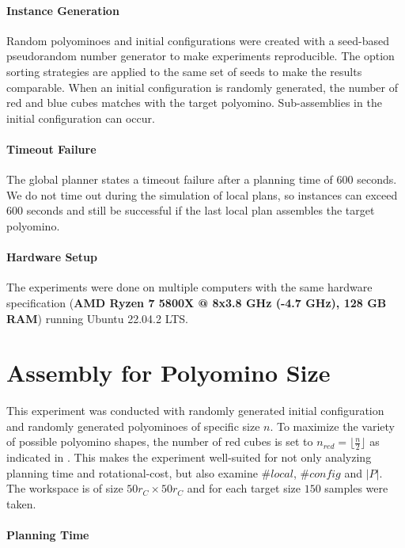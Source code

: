 \paragraph{Instance Generation}
Random polyominoes and initial configurations were created with a seed-based pseudorandom number generator to make experiments reproducible.
The option sorting strategies are applied to the same set of seeds to make the results comparable.
When an initial configuration is randomly generated, the number of red and blue cubes matches with the target polyomino.
Sub-assemblies in the initial configuration can occur.

\paragraph{Timeout Failure}
The global planner states a timeout failure after a planning time of $600$ seconds.
We do not time out during the simulation of local plans, so instances can exceed $600$ seconds and still be successful if the last local plan assembles the target polyomino.

\paragraph{Hardware Setup}
The experiments were done on multiple computers with the same hardware specification (\textbf{AMD Ryzen 7 5800X @ 8x3.8 GHz (-4.7 GHz), 128 GB RAM}) running Ubuntu 22.04.2 LTS.



\section{Assembly for Polyomino Size}
\label{sec:AFN}

This experiment was conducted with randomly generated initial configuration and randomly generated polyominoes of specific size $n$.
To maximize the variety of possible polyomino shapes, the number of red cubes is set to $n_\textit{red} = \lfloor \frac{n}{2} \rfloor$ as indicated in \cite{Lu2021}.
This makes the experiment well-suited for not only analyzing planning time and rotational-cost, but also examine $\#\textit{local}$, $\#\textit{config}$ and $|P|$.
The workspace is of size $50 r_C \times 50 r_C$ and for each target size $150$ samples were taken.

\paragraph{Planning Time}

